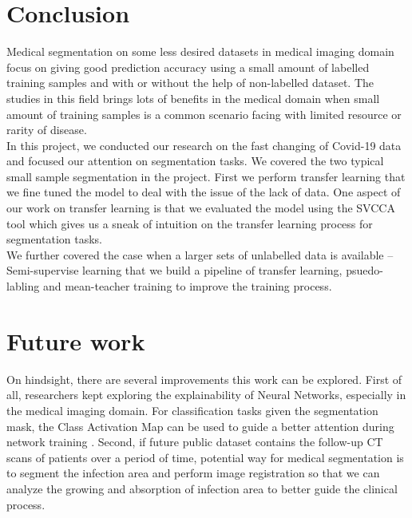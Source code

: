 \section{Conclusion}
Medical segmentation on some less desired datasets in medical imaging domain focus on giving good prediction accuracy using a small amount of labelled training samples and with or without the help of non-labelled dataset. The studies in this field brings lots of benefits in the medical domain when small amount of training samples is a common scenario facing with limited resource or rarity of disease.\\

In this project, we conducted our research on the fast changing of Covid-19 data and focused our attention on segmentation tasks. We covered the two typical small sample segmentation in the project. First we perform transfer learning that we fine tuned the model to deal with the issue of the lack of data. One aspect of our work on transfer learning is that we evaluated the model using the SVCCA tool which gives us a sneak of intuition on the transfer learning process for segmentation tasks.\\

We further covered the case when a larger sets of unlabelled data is available -- Semi-supervise learning that we build a pipeline of transfer learning, psuedo-labling and mean-teacher training to improve the training process.

\section{Future work}
On hindsight, there are several improvements this work can be explored. First of all, researchers kept exploring the explainability of Neural Networks, especially in the medical imaging domain. For classification tasks given the segmentation mask, the Class Activation Map can be used to guide a better attention during network training \cite{Ouyang_2020}. Second, if future public dataset contains the follow-up CT scans of patients over a period of time, potential way for medical segmentation is to segment the infection area and perform image registration so that we can analyze the growing and absorption of infection area to better guide the clinical process.